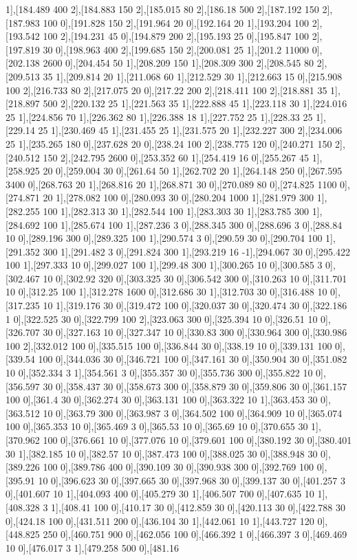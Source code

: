 {1],[184.489 400 2],[184.883 150 2],[185.015 80 2],[186.18 500 2],[187.192 150 2],[187.983 100 0],[191.828 150 2],[191.964 20 0],[192.164 20 1],[193.204 100 2],[193.542 100 2],[194.231 45 0],[194.879 200 2],[195.193 25 0],[195.847 100 2],[197.819 30 0],[198.963 400 2],[199.685 150 2],[200.081 25 1],[201.2 11000 0],[202.138 2600 0],[204.454 50 1],[208.209 150 1],[208.309 300 2],[208.545 80 2],[209.513 35 1],[209.814 20 1],[211.068 60 1],[212.529 30 1],[212.663 15 0],[215.908 100 2],[216.733 80 2],[217.075 20 0],[217.22 200 2],[218.411 100 2],[218.881 35 1],[218.897 500 2],[220.132 25 1],[221.563 35 1],[222.888 45 1],[223.118 30 1],[224.016 25 1],[224.856 70 1],[226.362 80 1],[226.388 18 1],[227.752 25 1],[228.33 25 1],[229.14 25 1],[230.469 45 1],[231.455 25 1],[231.575 20 1],[232.227 300 2],[234.006 25 1],[235.265 180 0],[237.628 20 0],[238.24 100 2],[238.775 120 0],[240.271 150 2],[240.512 150 2],[242.795 2600 0],[253.352 60 1],[254.419 16 0],[255.267 45 1],[258.925 20 0],[259.004 30 0],[261.64 50 1],[262.702 20 1],[264.148 250 0],[267.595 3400 0],[268.763 20 1],[268.816 20 1],[268.871 30 0],[270.089 80 0],[274.825 1100 0],[274.871 20 1],[278.082 100 0],[280.093 30 0],[280.204 1000 1],[281.979 300 1],[282.255 100 1],[282.313 30 1],[282.544 100 1],[283.303 30 1],[283.785 300 1],[284.692 100 1],[285.674 100 1],[287.236 3 0],[288.345 300 0],[288.696 3 0],[288.84 10 0],[289.196 300 0],[289.325 100 1],[290.574 3 0],[290.59 30 0],[290.704 100 1],[291.352 300 1],[291.482 3 0],[291.824 300 1],[293.219 16 -1],[294.067 30 0],[295.422 100 1],[297.333 10 0],[299.027 100 1],[299.48 300 1],[300.265 10 0],[300.585 3 0],[302.467 10 0],[302.92 320 0],[303.325 30 0],[306.542 300 0],[310.263 10 0],[311.701 10 0],[312.25 100 1],[312.278 1600 0],[312.686 30 1],[312.703 30 0],[316.488 10 0],[317.235 10 1],[319.176 30 0],[319.472 100 0],[320.037 30 0],[320.474 30 0],[322.186 1 0],[322.525 30 0],[322.799 100 2],[323.063 300 0],[325.394 10 0],[326.51 10 0],[326.707 30 0],[327.163 10 0],[327.347 10 0],[330.83 300 0],[330.964 300 0],[330.986 100 2],[332.012 100 0],[335.515 100 0],[336.844 30 0],[338.19 10 0],[339.131 100 0],[339.54 100 0],[344.036 30 0],[346.721 100 0],[347.161 30 0],[350.904 30 0],[351.082 10 0],[352.334 3 1],[354.561 3 0],[355.357 30 0],[355.736 300 0],[355.822 10 0],[356.597 30 0],[358.437 30 0],[358.673 300 0],[358.879 30 0],[359.806 30 0],[361.157 100 0],[361.4 30 0],[362.274 30 0],[363.131 100 0],[363.322 10 1],[363.453 30 0],[363.512 10 0],[363.79 300 0],[363.987 3 0],[364.502 100 0],[364.909 10 0],[365.074 100 0],[365.353 10 0],[365.469 3 0],[365.53 10 0],[365.69 10 0],[370.655 30 1],[370.962 100 0],[376.661 10 0],[377.076 10 0],[379.601 100 0],[380.192 30 0],[380.401 30 1],[382.185 10 0],[382.57 10 0],[387.473 100 0],[388.025 30 0],[388.948 30 0],[389.226 100 0],[389.786 400 0],[390.109 30 0],[390.938 300 0],[392.769 100 0],[395.91 10 0],[396.623 30 0],[397.665 30 0],[397.968 30 0],[399.137 30 0],[401.257 3 0],[401.607 10 1],[404.093 400 0],[405.279 30 1],[406.507 700 0],[407.635 10 1],[408.328 3 1],[408.41 100 0],[410.17 30 0],[412.859 30 0],[420.113 30 0],[422.788 30 0],[424.18 100 0],[431.511 200 0],[436.104 30 1],[442.061 10 1],[443.727 120 0],[448.825 250 0],[460.751 900 0],[462.056 100 0],[466.392 1 0],[466.397 3 0],[469.469 10 0],[476.017 3 1],[479.258 500 0],[481.16 }
